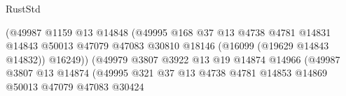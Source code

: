 \begin{lexlean}{RustStd}
\begin{coremodule}
                                                    (@49987
                                                      @1159
                                                      @13
                                                      @14848
                                                      (@49995
                                                        @168
                                                        @37
                                                        @13
                                                        @4738
                                                        @4781
                                                        @14831
                                                        @14843
                                                        @50013
                                                        @47079
                                                        @47083
                                                        @30810
                                                        @18146
                                                        (@16099 (@19629 @14843 @14832))
                                                        @16249))
                                                    (@49979
                                                      @3807
                                                      @3922
                                                      @13
                                                      @19
                                                      @14874
                                                      @14966
                                                      (@49987
                                                        @3807
                                                        @13
                                                        @14874
                                                        (@49995
                                                          @321
                                                          @37
                                                          @13
                                                          @4738
                                                          @4781
                                                          @14853
                                                          @14869
                                                          @50013
                                                          @47079
                                                          @47083
                                                          @30424

\end{coremodule}
\end{lexlean}
